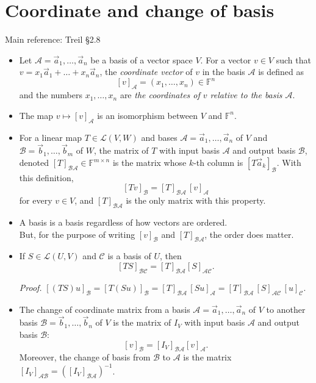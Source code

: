 \documentclass[11pt]{article}
\newcommand{\1}{\mathbf{1}}
\newcommand{\0}{\mathbf{0}}
\newcommand{\A}{\mathcal{A}}
\newcommand{\B}{\mathcal{B}}
\newcommand{\cC}{\mathcal{C}}
\newcommand{\F}{\mathbb{F}}
\newcommand{\va}{\vec{a}}
\newcommand{\vb}{\vec{b}}
\newcommand{\spitem}{\item[$\circ$]}
\begin{document}
\clearpage
\section{Coordinate and change of basis}

Main reference:
Treil
\S2.8

\begin{itemize}

\item

Let $\A=\va_1,\dots,\va_n$ be a basis of a vector space $V$. For a vector $v\in V$ such that $v=x_1\va_1+\dots+x_n\va_n$, the \emph{coordinate vector} of $v$ in the basis $\A$ is defined as
\[
[v]_{\A}=(x_1,\dots,x_n) \in \F^n
\]
and the numbers $x_1,\dots,x_n$ are \emph{the coordinates of $v$ relative to the basis $\A$}.

\item

The map $v \mapsto [v]_\A$ is an isomorphism between $V$ and $\F^n$.

\item

For a linear map $T\in\mathcal{L}(V,W)$ and bases $\A=\va_1,\dots,\va_n$ of $V$ and $\B=\vb_1,\dots,\vb_m$ of $W$, the matrix of $T$ with input basis $\A$ and output basis $\B$, denoted $[T]_{\B\A}\in \F^{m \times n}$ is the matrix whose $k$-th column is $[T\va_k]_{\B}$.
With this definition,
\[
[Tv]_{\B}=[T]_{\B\A} \, [v]_{\A}
\]
for every $v\in V$, and $[T]_{\B\A}$ is the only matrix with this property.

\spitem

A basis is a basis regardless of how vectors are ordered.
\\
But, for the purpose of writing $[v]_\B$ and $[T]_{\B\A}$, the order does matter.

\item

If $S\in\mathcal{L}(U,V)$ and $\mathcal{C}$ is a basis of $U$, then 
\[
[TS]_{\B\mathcal{C}}=[T]_{\B\A}[S]_{\A\mathcal{C}}.
\]

\emph{Proof.}
$[(TS)u]_\B = [T(Su)]_\B = [T]_{\B\A} \, [Su]_\A = [T]_{\B\A} \, [S]_{\A\cC} \, [u]_\cC.$

\item

The change of coordinate matrix from a basis $\A=\va_1,\dots,\va_n$ of $V$ to another basis $\B=\vb_1,\dots,\vb_n$ of $V$ is the matrix of $I_V$ with input basis $\A$ and output basis $\B$:
\[
[v]_{\B}=[I_V]_{\B\A}[v]_{\A}.
\]
Moreover, the change of basis from $\B$ to $\A$ is the matrix $[I_V]_{\A\B}=\left([I_V]_{\B\A}\right)^{-1}$.


\end{itemize}
\end{document}
